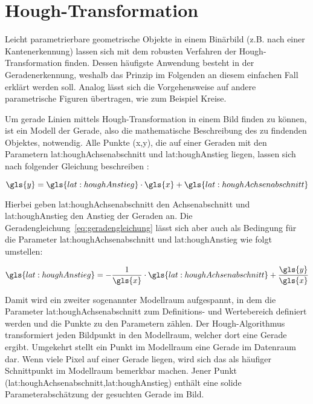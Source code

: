\section{Hough-Transformation}

Leicht parametrierbare geometrische Objekte in einem Binärbild (z.B. nach einer Kantenerkennung) lassen sich mit dem robusten Verfahren der Hough-Transformation finden. Dessen häufigste Anwendung besteht in der Geradenerkennung, weshalb das Prinzip im Folgenden an diesem einfachen Fall erklärt werden soll. Analog lässt sich die Vorgehensweise auf andere parametrische Figuren übertragen, wie zum Beispiel Kreise.

Um gerade Linien mittels Hough-Transformation in einem Bild finden zu können, ist ein Modell der Gerade, also die mathematische Beschreibung des zu findenden Objektes, notwendig. Alle Punkte (\gls{x},\gls{y}), die auf einer Geraden mit den Parametern \gls{lat:houghAchsenabschnitt} und \gls{lat:houghAnstieg} liegen, lassen sich nach folgender Gleichung beschreiben \autocite{jaehneDigitaleBildverarbeitungMit2005}:

\begin{equation}
\gls{y} = \gls{lat:houghAnstieg} \cdot \gls{x} + \gls{lat:houghAchsenabschnitt}
\label{eq:geradengleichung}
\end{equation}

Hierbei geben \gls{lat:houghAchsenabschnitt} den Achsenabschnitt und \gls{lat:houghAnstieg} den Anstieg der Geraden an. Die Geradengleichung~\ref{eq:geradengleichung} lässt sich aber auch als Bedingung für die Parameter \gls{lat:houghAchsenabschnitt} und \gls{lat:houghAnstieg} wie folgt umstellen:

\begin{equation}
\gls{lat:houghAnstieg} = -\frac{1}{\gls{x}} \cdot \gls{lat:houghAchsenabschnitt} + \frac{\gls{y}}{\gls{x}}
\end{equation}

Damit wird ein zweiter sogenannter Modellraum aufgespannt, in dem die Parameter \gls{lat:houghAchsenabschnitt} zum Definitions- und Wertebereich definiert werden und die Punkte zu den Parametern zählen. Der Hough-Algorithmus transformiert jeden Bildpunkt in den Modellraum, welcher dort eine Gerade ergibt. Umgekehrt stellt ein Punkt im Modellraum eine Gerade im Datenraum dar. Wenn viele Pixel auf einer Gerade liegen, wird sich das als häufiger Schnittpunkt im Modellraum bemerkbar machen. Jener Punkt (\gls{lat:houghAchsenabschnitt},\gls{lat:houghAnstieg}) enthält eine solide Parameterabschätzung der gesuchten Gerade im Bild.

